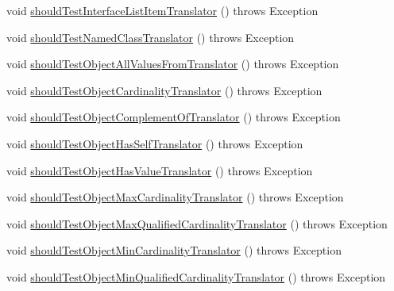 \begin{DoxyCompactItemize}
\item 
void \hyperlink{classorg_1_1semanticweb_1_1owlapi_1_1contract_1_1_contract_rdfxml_parser_test_a863f39bb1b94b1269d8a6f65a3d775a5}{should\-Test\-Interface\-List\-Item\-Translator} ()  throws Exception 
\item 
void \hyperlink{classorg_1_1semanticweb_1_1owlapi_1_1contract_1_1_contract_rdfxml_parser_test_ad6dcf34867ed0cdc98a032d0c2f0acfc}{should\-Test\-Named\-Class\-Translator} ()  throws Exception 
\item 
void \hyperlink{classorg_1_1semanticweb_1_1owlapi_1_1contract_1_1_contract_rdfxml_parser_test_a7519b9222ea76d252e5a9ab152c0d0d5}{should\-Test\-Object\-All\-Values\-From\-Translator} ()  throws Exception 
\item 
void \hyperlink{classorg_1_1semanticweb_1_1owlapi_1_1contract_1_1_contract_rdfxml_parser_test_a1c13db2427c283ee9c08b76691060b75}{should\-Test\-Object\-Cardinality\-Translator} ()  throws Exception 
\item 
void \hyperlink{classorg_1_1semanticweb_1_1owlapi_1_1contract_1_1_contract_rdfxml_parser_test_a22678895fc32bfb6903eba2ef3be439b}{should\-Test\-Object\-Complement\-Of\-Translator} ()  throws Exception 
\item 
void \hyperlink{classorg_1_1semanticweb_1_1owlapi_1_1contract_1_1_contract_rdfxml_parser_test_a19e4b3a4df4c958f2f04560bed2261df}{should\-Test\-Object\-Has\-Self\-Translator} ()  throws Exception 
\item 
void \hyperlink{classorg_1_1semanticweb_1_1owlapi_1_1contract_1_1_contract_rdfxml_parser_test_aeaaa33dd0739bd7b309da2d905ef4169}{should\-Test\-Object\-Has\-Value\-Translator} ()  throws Exception 
\item 
void \hyperlink{classorg_1_1semanticweb_1_1owlapi_1_1contract_1_1_contract_rdfxml_parser_test_a886a6dc3af4d7ba900913e76e6f92c12}{should\-Test\-Object\-Max\-Cardinality\-Translator} ()  throws Exception 
\item 
void \hyperlink{classorg_1_1semanticweb_1_1owlapi_1_1contract_1_1_contract_rdfxml_parser_test_aa58787f242d8084c749f0c7ca5216aa4}{should\-Test\-Object\-Max\-Qualified\-Cardinality\-Translator} ()  throws Exception 
\item 
void \hyperlink{classorg_1_1semanticweb_1_1owlapi_1_1contract_1_1_contract_rdfxml_parser_test_ab7c0b9754a9ad2c0b80f20b35ec0c4c1}{should\-Test\-Object\-Min\-Cardinality\-Translator} ()  throws Exception 
\item 
void \hyperlink{classorg_1_1semanticweb_1_1owlapi_1_1contract_1_1_contract_rdfxml_parser_test_a424aee0b8a0341781c2b9c8dab37b1ab}{should\-Test\-Object\-Min\-Qualified\-Cardinality\-Translator} ()  throws Exception 

\end{DoxyCompactItemize}

